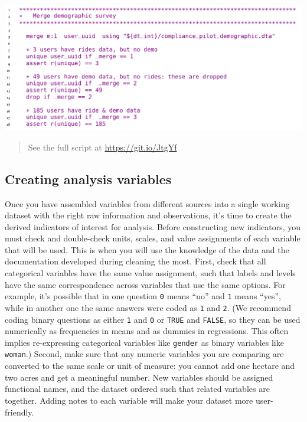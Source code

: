 \documentclass[
]{book}
\begin{document}
\begin{ex}
\includegraphics{examples/ch6-integrating-multiple-data-sources2.png}

\begin{quote}
See the full script at \url{https://git.io/JtgYf}
\end{quote}
\end{ex}

\hypertarget{creating-analysis-variables}{%
\subsection*{Creating analysis variables}\label{creating-analysis-variables}}

Once you have assembled variables from different sources into a single working dataset
with the right raw information and observations,
it's time to create the derived indicators of interest for analysis.
Before constructing new indicators,
you must check and double-check units, scales, and value assignments of each variable that will be used.
This is when you will use the knowledge
of the data and the documentation developed during cleaning the most.
First, check that all categorical variables have the same value assignment,
such that labels and levels have the same correspondence across variables that use the same options.
For example, it's possible that in one question \texttt{0} means ``no'' and \texttt{1} means ``yes'',
while in another one the same answers were coded as \texttt{1} and \texttt{2}.
(We recommend coding binary questions as either \texttt{1} and \texttt{0} or \texttt{TRUE} and \texttt{FALSE},
so they can be used numerically as frequencies in means and as dummies in regressions.
This often implies re-expressing categorical variables like \texttt{gender} as binary variables like \texttt{woman}.)
Second, make sure that any numeric variables you are comparing
are converted to the same scale or unit of measure:
you cannot add one hectare and two acres and get a meaningful number.
New variables should be assigned functional names,
and the dataset ordered such that related variables are together.
Adding notes to each variable will make your dataset more user-friendly.
\end{document}
